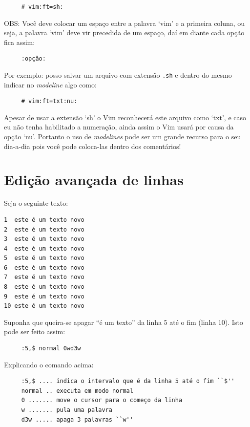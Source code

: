 \documentclass[10pt,a4paper,openany]{book}
\begin{document}
\begin{verbatim}
     # vim:ft=sh:
\end{verbatim}

OBS: Você deve colocar um espaço entre a palavra `vim' e a primeira
coluna, ou seja, a palavra `vim' deve vir precedida de um espaço, daí
em diante cada opção fica assim:

\begin{verbatim}
     :opção:
\end{verbatim}

Por exemplo: posso salvar um arquivo com extensão \verb|.sh| e dentro do
mesmo indicar no {\em modeline} algo como:

\begin{verbatim}
     # vim:ft=txt:nu:
\end{verbatim}

Apesar de usar a extensão `sh' o Vim reconhecerá este arquivo como `txt', e
caso eu não tenha habilitado a numeração, ainda assim o Vim usará por causa da
opção `nu'.  Portanto o uso de {\em modelines} pode ser um grande recurso para o seu
dia-a-dia pois você pode coloca-las dentro dos comentários!

\section{Edição avançada de linhas}

Seja o seguinte texto:

\begin{verbatim}
1  este é um texto novo
2  este é um texto novo
3  este é um texto novo
4  este é um texto novo
5  este é um texto novo
6  este é um texto novo
7  este é um texto novo
8  este é um texto novo
9  este é um texto novo
10 este é um texto novo
\end{verbatim}

Suponha que queira-se apagar ``é um texto'' da linha 5 até o fim (linha 10). Isto pode ser feito
assim: 

\begin{verbatim}
     :5,$ normal 0wd3w
\end{verbatim}

Explicando o comando acima:

\begin{verbatim}
     :5,$ .... indica o intervalo que é da linha 5 até o fim ``$''
     normal .. executa em modo normal
     0 ....... move o cursor para o começo da linha
     w ....... pula uma palavra
     d3w ..... apaga 3 palavras ``w''
\end{verbatim}
\end{document}
